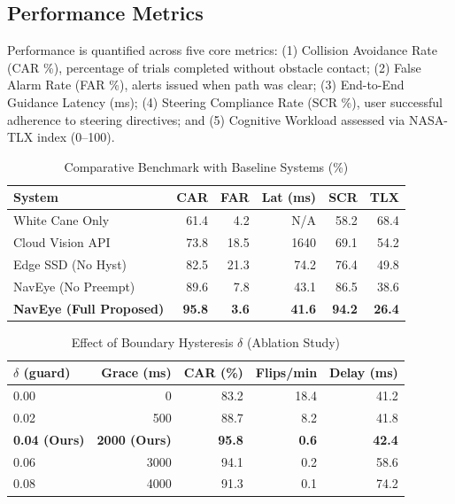 \documentclass[conference]{IEEEtran}
\begin{document}
\subsection{Performance Metrics}
Performance is quantified across five core metrics: (1) Collision Avoidance Rate (CAR \%), percentage of trials completed without obstacle contact; (2) False Alarm Rate (FAR \%), alerts issued when path was clear; (3) End-to-End Guidance Latency (ms); (4) Steering Compliance Rate (SCR \%), user successful adherence to steering directives; and (5) Cognitive Workload assessed via NASA-TLX index (0--100).

\begin{table}[t]
\centering
\caption{Comparative Benchmark with Baseline Systems (\%)}
\label{tab:benchmark}
\begin{tabular}{lrrrrr}
\toprule
\textbf{System} & \textbf{CAR} & \textbf{FAR} & \textbf{Lat (ms)} & \textbf{SCR} & \textbf{TLX} \\
\midrule
White Cane Only & 61.4 & 4.2 & N/A & 58.2 & 68.4 \\
Cloud Vision API & 73.8 & 18.5 & 1640 & 69.1 & 54.2 \\
Edge SSD (No Hyst) & 82.5 & 21.3 & 74.2 & 76.4 & 49.8 \\
NavEye (No Preempt) & 89.6 & 7.8 & 43.1 & 86.5 & 38.6 \\
\textbf{NavEye (Full Proposed)} & \textbf{95.8} & \textbf{3.6} & \textbf{41.6} & \textbf{94.2} & \textbf{26.4} \\
\bottomrule
\end{tabular}
\end{table}

\begin{table}[t]
\centering
\caption{Effect of Boundary Hysteresis $\delta$ (Ablation Study)}
\label{tab:ablation}
\begin{tabular}{lrrrr}
\toprule
\textbf{$\delta$ (guard)} & \textbf{Grace (ms)} & \textbf{CAR (\%)} & \textbf{Flips/min} & \textbf{Delay (ms)} \\
\midrule
0.00 & 0 & 83.2 & 18.4 & 41.2 \\
0.02 & 500 & 88.7 & 8.2 & 41.8 \\
\textbf{0.04 (Ours)} & \textbf{2000 (Ours)} & \textbf{95.8} & \textbf{0.6} & \textbf{42.4} \\
0.06 & 3000 & 94.1 & 0.2 & 58.6 \\
0.08 & 4000 & 91.3 & 0.1 & 74.2 \\
\bottomrule
\end{tabular}
\end{table}
\end{document}
